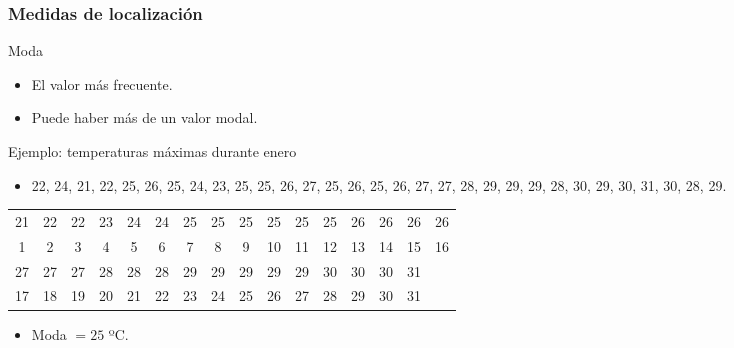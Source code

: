 \documentclass[table]{beamer}
\begin{document}
\begin{frame}
    \frametitle{Medidas de localización}
    \begin{block}{Moda}
        \begin{itemize}
            \item El valor más frecuente.
            \item Puede haber más de un valor modal.
        \end{itemize}
    \end{block}
    \begin{exampleblock}{Ejemplo: temperaturas máximas durante enero}
        \begin{itemize}
            \item 22, 24, 21, 22, 25, 26, 25, 24, 23, 25, 25, 26, 27, 25, 26, 25, 26, 27, 27, 28, 29, 29, 29, 28, 30, 29, 30, 31, 30, 28, 29.
        \end{itemize}
            \begin{center}
                \footnotesize
                \begin{tabular}{cccccccccccccccc}
                    21 & 22 & 22 & 23 & 24 & 24 & 25 & 25 & 25 & 25 & 25 & 25 & 26 & 26 & 26 & 26 \\
                    1 & 2 & 3 & 4 & 5 & 6 & 7 & 8 & 9 & 10 & 11 & 12 & 13 & 14 & 15 & 16 \\
                    \hline
                    27 & 27 & 27 & 28 & 28 & 28 & 29 & 29 & 29 & 29 & 29 & 30 & 30 & 30 & 31 & \\
                    17 & 18 & 19 & 20 & 21 & 22 & 23 & 24 & 25 & 26 & 27 & 28 & 29 & 30 & 31 & \\
                \end{tabular}
            \end{center}
        \begin{itemize}
            \item Moda $= 25$ ºC.
        \end{itemize}
    \end{exampleblock}
\end{frame}
\end{document}
